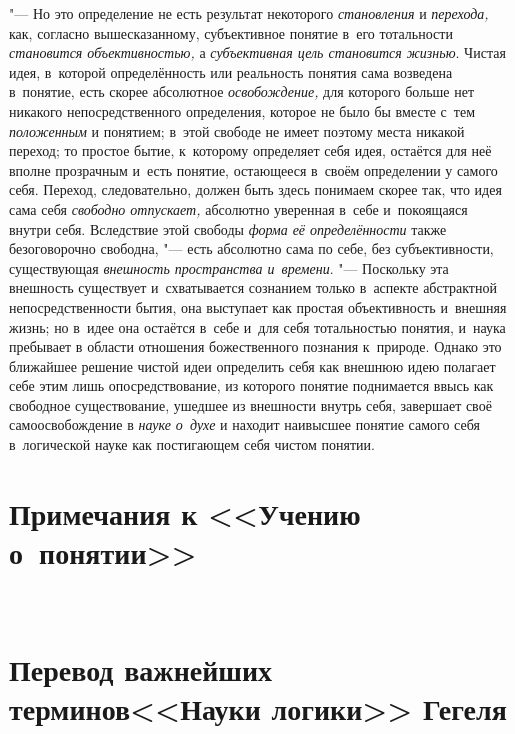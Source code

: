 "--- Но это определение не есть результат некоторого
{\em становления} и {\em перехода,} как,
согласно вышесказанному, субъективное понятие в~его тотальности
{\em становится объективностью,} а {\em субъективная цель
становится жизнью}. Чистая идея, в~которой определённость
или реальность понятия сама возведена в~понятие, есть скорее абсолютное
{\em освобождение,} для
которого больше нет никакого непосредственного определения, которое не было
бы вместе с~тем {\em положенным}
и понятием; в~этой свободе не имеет поэтому места никакой
переход; то простое бытие, к~которому определяет себя идея, остаётся для
неё вполне прозрачным и~есть понятие, остающееся в~своём определении у
самого себя. Переход, следовательно, должен быть здесь понимаем скорее так,
что идея сама себя {\em свободно
отпускает,} абсолютно уверенная в~себе и~покоящаяся внутри
себя. Вследствие этой свободы {\em форма
её определённости} также безоговорочно свободна, "---
есть абсолютно сама по себе, без субъективности, существующая
{\em внешность пространства и~времени}.
"--- Поскольку эта внешность существует и~схватывается
сознанием только в~аспекте абстрактной непосредственности
бытия, она выступает как простая объективность и~внешняя жизнь; но в~идее
она остаётся в~себе и~для себя тотальностью понятия, и~наука пребывает в
области отношения божественного познания к~природе. Однако это ближайшее
решение чистой идеи определить себя как внешнюю идею полагает себе этим
лишь опосредствование, из которого понятие поднимается ввысь как свободное
существование, ушедшее из внешности внутрь себя, завершает своё
самоосвобождение в {\em науке о~духе}
и находит наивысшее понятие самого себя в~логической науке
как постигающем себя чистом понятии.

\clearpage

\chapter[Примечания к <<Учению о~понятии>>]{Примечания к <<Учению о~понятии>>}

\printpagenotes

\clearpage\
\chapter[Перевод важнейших терминов <<Науки логики>> Гегеля]
{Перевод важнейших терминов\newline<<Науки логики>> Гегеля}

